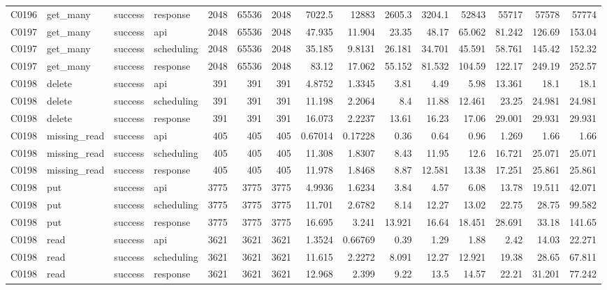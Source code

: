 \begin{landscape}
\begin{longtable}{llllrrrrrrrrrrr}
C0196 & get\_\allowbreak{}many & success & response & 2048 & 65536 & 2048 & 7022.5 & 12883 & 2605.3 & 3204.1 & 52843 & 55717 & 57578 & 57774\\
C0197 & get\_\allowbreak{}many & success & api & 2048 & 65536 & 2048 & 47.935 & 11.904 & 23.35 & 48.17 & 65.062 & 81.242 & 126.69 & 153.04\\
C0197 & get\_\allowbreak{}many & success & scheduling & 2048 & 65536 & 2048 & 35.185 & 9.8131 & 26.181 & 34.701 & 45.591 & 58.761 & 145.42 & 152.32\\
C0197 & get\_\allowbreak{}many & success & response & 2048 & 65536 & 2048 & 83.12 & 17.062 & 55.152 & 81.532 & 104.59 & 122.17 & 249.19 & 252.57\\
C0198 & delete & success & api & 391 & 391 & 391 & 4.8752 & 1.3345 & 3.81 & 4.49 & 5.98 & 13.361 & 18.1 & 18.1\\
C0198 & delete & success & scheduling & 391 & 391 & 391 & 11.198 & 2.2064 & 8.4 & 11.88 & 12.461 & 23.25 & 24.981 & 24.981\\
C0198 & delete & success & response & 391 & 391 & 391 & 16.073 & 2.2237 & 13.61 & 16.23 & 17.06 & 29.001 & 29.931 & 29.931\\
C0198 & missing\_\allowbreak{}read & success & api & 405 & 405 & 405 & 0.67014 & 0.17228 & 0.36 & 0.64 & 0.96 & 1.269 & 1.66 & 1.66\\
C0198 & missing\_\allowbreak{}read & success & scheduling & 405 & 405 & 405 & 11.308 & 1.8307 & 8.43 & 11.95 & 12.6 & 16.721 & 25.071 & 25.071\\
C0198 & missing\_\allowbreak{}read & success & response & 405 & 405 & 405 & 11.978 & 1.8468 & 8.87 & 12.581 & 13.38 & 17.251 & 25.861 & 25.861\\
C0198 & put & success & api & 3775 & 3775 & 3775 & 4.9936 & 1.6234 & 3.84 & 4.57 & 6.08 & 13.78 & 19.511 & 42.071\\
C0198 & put & success & scheduling & 3775 & 3775 & 3775 & 11.701 & 2.6782 & 8.14 & 12.27 & 13.02 & 22.75 & 28.75 & 99.582\\
C0198 & put & success & response & 3775 & 3775 & 3775 & 16.695 & 3.241 & 13.921 & 16.64 & 18.451 & 28.691 & 33.18 & 141.65\\
C0198 & read & success & api & 3621 & 3621 & 3621 & 1.3524 & 0.66769 & 0.39 & 1.29 & 1.88 & 2.42 & 14.03 & 22.271\\
C0198 & read & success & scheduling & 3621 & 3621 & 3621 & 11.615 & 2.2272 & 8.091 & 12.27 & 12.921 & 19.38 & 28.65 & 67.811\\
C0198 & read & success & response & 3621 & 3621 & 3621 & 12.968 & 2.399 & 9.22 & 13.5 & 14.57 & 22.21 & 31.201 & 77.242\\

\end{longtable}
\end{landscape}
